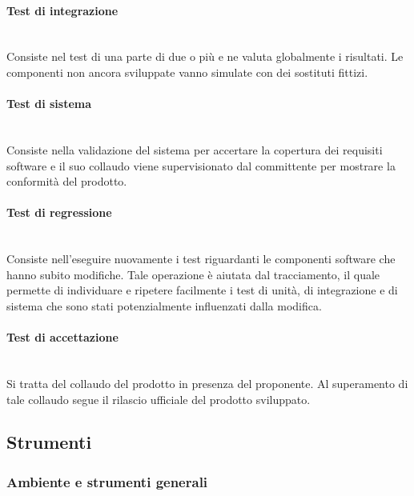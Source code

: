 			\paragraph{Test di integrazione} \mbox{} \\

			Consiste nel test di una parte di due o più  e ne valuta globalmente i risultati. Le componenti non ancora sviluppate vanno simulate con dei sostituti fittizi.
			
			\paragraph{Test di sistema} \mbox{} \\

			Consiste nella validazione del sistema per accertare la copertura dei requisiti software e il suo collaudo viene supervisionato dal committente per mostrare la conformità del prodotto.
			
			\paragraph{Test di regressione} \mbox{} \\

			Consiste nell'eseguire nuovamente i test riguardanti le componenti software che hanno subito modifiche.	Tale operazione è aiutata dal tracciamento, il quale permette di individuare e ripetere facilmente i test di unità, di integrazione e di sistema che sono stati potenzialmente influenzati dalla modifica.
			
			\paragraph{Test di accettazione} \mbox{} \\

			Si tratta del collaudo del prodotto in presenza del proponente. Al superamento di tale collaudo segue il rilascio ufficiale del prodotto sviluppato.

 
 
 \subsection{Strumenti}			
	\subsubsection{Ambiente e strumenti generali}
		
